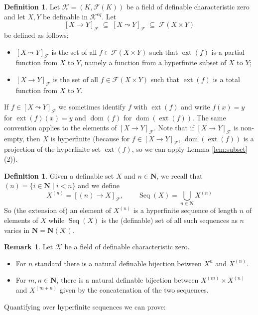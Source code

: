 \documentclass{amsart}
\newcommand{\ca}{\mathcal}
\newcommand{\Seq}{\operatorname{Seq}}
\newcommand{\dom}{\operatorname{dom}}
\theoremstyle{plain}
\theoremstyle{definition}
\newtheorem{rem}[thm]{Remark}
\newtheorem{defn}[thm]{Definition}
\newcommand{\F}{\mathcal{F}}
\newcommand{\ext}[1]{\operatorname{ext}(#1)}
\newcommand{\hn}{\mathbf N}
\newcommand{\pto}{\leadsto} %
\newcommand{\pfun}[2]{[#1 \pto #2]_{\F}}
\newcommand{\fun}[2]{[#1 \to #2]_{\F}}
\begin{document}
\begin{defn} \label{defn:functions} Let $\ca K = (K, \F(K))$ be a field of definable characteristic zero and let $X,Y$ be definable in $\ca K^{eq}$. Let 
$$\fun X Y \;\subseteq \; \pfun X Y \; \subseteq \; \F(X\times Y)$$
be defined as follows: 
\begin{itemize}
\item $\pfun X Y$ is the set of all $f\in \F(X\times Y)$ such that $\ext f$ is a partial function from $X$ to $Y$, namely a function from a hyperfinite subset of $X$ to $Y$; 
\item $\fun X Y$ is the set of all $f\in \F(X\times Y)$ such that $\ext f$ is a total function from $X$ to $Y$. 
 \end{itemize}
 If $f\in \pfun X Y$ we sometimes identify $f$ with $\ext f$ and write $f(x) = y$ for $\ext f (x) = y$ and $\dom(f)$ for $\dom(\ext f)$. The same convention applies to the elements of $\fun X Y$. Note that if $\fun X Y$ is non-empty, then $X$ is hyperfinite (because for $f\in \fun X Y$,  $\dom(\ext f)$ is a projection of the hyperfinite set $\ext f$, so we can apply Lemma \ref{lem:subset}(2)).
 \end{defn}
 
 \begin{defn}\label{defn:sequences} Given a definable set $X$ and $n\in \hn$, we recall that $(n) = \{i\in \hn \mid i < n\}$ and we define 
 $$X^{(n)} = \fun {(n)} X, \quad \quad \Seq(X) = \bigcup_{n\in \hn} X^{(n)}$$
 So (the extension of) an element of $X^{(n)}$ is a hyperfinite sequence of length $n$ of elements of $X$ while $\Seq(X)$ is the (definable) set of all such sequences as $n$ varies in $\hn = \hn(\ca K)$. 
 \end{defn}
 
\begin{rem} Let $\ca K$ be a field of definable characteristic zero. 
\begin{itemize}
\item 
For $n$ standard there is a natural definable bijection between $X^n$ and $X^{(n)}$. 
\item For $m,n \in \hn$, there is a natural definable bijection between $X^{(m)} \times X^{(n)}$ and $X^{(m+n)}$ given by the concatenation of the two sequences. 
\end{itemize}
\end{rem}



Quantifying over hyperfinite sequences we can prove: 
\end{document}
